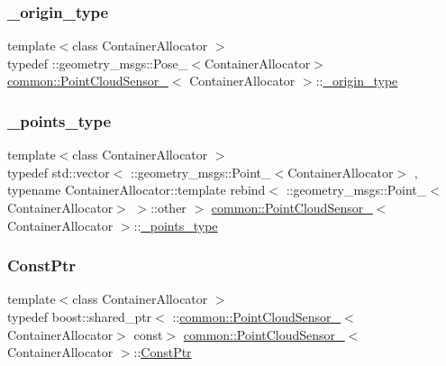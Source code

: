 \subsubsection{\texorpdfstring{\+\_\+origin\+\_\+type}{\_origin\_type}}
{\footnotesize\ttfamily template$<$class Container\+Allocator $>$ \\
typedef \+::geometry\+\_\+msgs\+::\+Pose\+\_\+$<$Container\+Allocator$>$ \hyperlink{structcommon_1_1PointCloudSensor__}{common\+::\+Point\+Cloud\+Sensor\+\_\+}$<$ Container\+Allocator $>$\+::\hyperlink{structcommon_1_1PointCloudSensor___a68f3e06b319324c54ccf6930c76ce5a5}{\+\_\+origin\+\_\+type}}

\mbox{\label{structcommon_1_1PointCloudSensor___ad2bc50eca8da26178a900f86334007b5}} 
\subsubsection{\texorpdfstring{\+\_\+points\+\_\+type}{\_points\_type}}
{\footnotesize\ttfamily template$<$class Container\+Allocator $>$ \\
typedef std\+::vector$<$ \+::geometry\+\_\+msgs\+::\+Point\+\_\+$<$Container\+Allocator$>$ , typename Container\+Allocator\+::template rebind$<$ \+::geometry\+\_\+msgs\+::\+Point\+\_\+$<$Container\+Allocator$>$ $>$\+::other $>$ \hyperlink{structcommon_1_1PointCloudSensor__}{common\+::\+Point\+Cloud\+Sensor\+\_\+}$<$ Container\+Allocator $>$\+::\hyperlink{structcommon_1_1PointCloudSensor___ad2bc50eca8da26178a900f86334007b5}{\+\_\+points\+\_\+type}}

\mbox{\label{structcommon_1_1PointCloudSensor___a117bed0d1fee46f191b44bc8563bd10c}} 
\subsubsection{\texorpdfstring{Const\+Ptr}{ConstPtr}}
{\footnotesize\ttfamily template$<$class Container\+Allocator $>$ \\
typedef boost\+::shared\+\_\+ptr$<$ \+::\hyperlink{structcommon_1_1PointCloudSensor__}{common\+::\+Point\+Cloud\+Sensor\+\_\+}$<$Container\+Allocator$>$ const$>$ \hyperlink{structcommon_1_1PointCloudSensor__}{common\+::\+Point\+Cloud\+Sensor\+\_\+}$<$ Container\+Allocator $>$\+::\hyperlink{structcommon_1_1PointCloudSensor___a117bed0d1fee46f191b44bc8563bd10c}{Const\+Ptr}}

